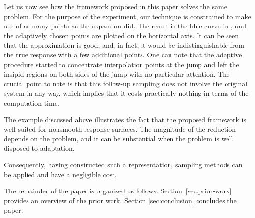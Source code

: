 Let us now see how the framework proposed in this paper solves the same problem.
For the purpose of the experiment, our technique is constrained to make use of
as many points as the  expansion did. The result is the blue curve in
, and the adaptively chosen points are plotted on the
horizontal axis. It can be seen that the approximation is good, and, in fact, it
would be indistinguishable from the true response with a few additional points.
One can note that the adaptive procedure started to concentrate interpolation
points at the jump and left the insipid regions on both sides of the jump with
no particular attention.  The crucial point to note is that this follow-up sampling
does not involve the original system in any way, which implies that it costs
practically nothing in terms of the computation time.

The example discussed above illustrates the fact that the proposed framework is
well suited for nonsmooth response surfaces.  The magnitude of the reduction depends on the
problem, and it can be substantial when the problem is well disposed to
adaptation.

Consequently, having constructed such a representation, sampling methods can be
applied and have a negligible cost.

The remainder of the paper is organized as follows. Section~\ref{sec:prior-work}
provides an overview of the prior work.  Section \ref{sec:conclusion} concludes the
paper.
